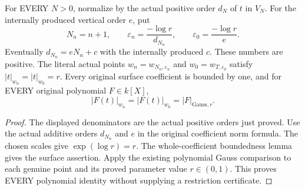 \begin{theorem}
\label{thm:gauss-surface-actual-fixed-radius-points}
\leanok
\leavevmode\par
For EVERY $N>0$, normalize by the actual positive order $d_N$ of $t$
in $V_N$. For the internally produced vertical order $e$, put
\[
 N_n=n+1,\qquad
 \varepsilon_n=\frac{-\log r}{d_{N_n}},\qquad
 \varepsilon_0=\frac{-\log r}{e}.
\]
Eventually $d_{N_n}=eN_n+c$ with the internally produced $c$.
These numbers are positive. The literal actual points
$w_n=w_{N_n,\varepsilon_n}$ and $w_0=w_{T,\varepsilon_0}$ satisfy
$|t|_{w_n}=|t|_{w_0}=r$. Every original surface coefficient is bounded
by one, and for EVERY original polynomial $F\in k[X]$,
\[
 |F(t)|_{w_n}=|F(t)|_{w_0}=|F|_{\mathrm{Gauss},r}.
\]
\end{theorem}
\begin{proof}
The displayed denominators are the actual positive orders just proved.
Use the actual additive orders $d_{N_n}$ and $e$ in the original
coefficient norm formula. The chosen scales give $\exp(\log r)=r$.
The whole-coefficient boundedness lemma gives the surface assertion.
Apply the existing polynomial Gauss comparison to each genuine point
and its proved parameter value $r\in(0,1)$. This proves EVERY
polynomial identity without supplying a restriction certificate.
\end{proof}

